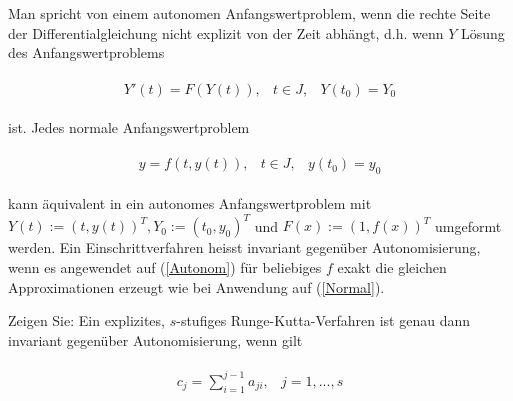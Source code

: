 \begin{exercise}

Man spricht von einem autonomen Anfangswertproblem, wenn die rechte Seite der Differentialgleichung
nicht explizit von der Zeit abhängt, d.h. wenn $Y$ Lösung des Anfangswertproblems

\begin{align}
\label{Autonom}
  \begin{array}{lll}
    Y'(t)=F(Y(t)), &t\in J, &Y(t_0)=Y_0
  \end{array}
\end{align}

ist. Jedes normale Anfangswertproblem

\begin{align}
  \label{Normal}
  \begin{array}{lll}
    y=f(t,y(t)), &t\in J, &y(t_0)=y_0
  \end{array}
\end{align}

kann äquivalent in ein autonomes Anfangswertproblem mit
$Y(t):=(t,y(t))^T, Y_0:=(t_0,y_0)^T$ und $F(x):=(1,f(x))^T$
umgeformt werden. Ein Einschrittverfahren heisst invariant gegenüber Autonomisierung,
wenn es angewendet auf (\ref{Autonom}) für beliebiges $f$ exakt die gleichen Approximationen
erzeugt wie bei Anwendung auf (\ref{Normal}). \newline

Zeigen Sie: Ein explizites, $s$-stufiges Runge-Kutta-Verfahren ist genau dann invariant
gegenüber Autonomisierung, wenn gilt

\begin{align} \label{Bedingung}
  \begin{array}{ll}
    c_j = \sum_{i=1}^{j-1} a_{ji}, &j=1,...,s
  \end{array}
\end{align}
\end{exercise}

